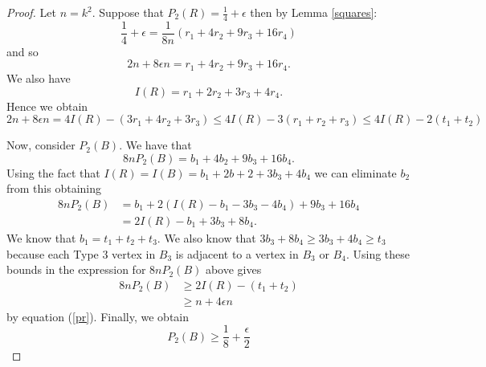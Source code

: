 \documentclass[10pt,a4paper]{amsart}
\newcommand{\eps}{\epsilon}
\begin{document}
\begin{proof}
Let $n=k^2$. Suppose that $P_2(R)=\frac{1}{4}+\eps$ then by Lemma \ref{squares}:
\[
\frac{1}{4}+\eps=\frac{1}{8n}\left(r_1+4r_2+9r_3+16r_4\right)
\]
and so
\[
2n+8\eps n=r_1+4r_2+9r_3+16r_4.
\]
We also have 
\[
I(R)=r_1+2r_2+3r_3+4r_4.
\]
Hence we obtain
\begin{equation}\label{pr}
2n+8\eps n=4I(R)-(3r_1+4r_2+3r_3)\leq 4I(R)-3(r_1+r_2+r_3)\leq 4I(R)-2(t_1+t_2)
\end{equation}

Now, consider $P_2(B)$. We have that
\[
8nP_2(B)=b_1+4b_2+9b_3+16b_4.
\]
Using the fact that $I(R)=I(B)=b_1+2b+2+3b_3+4b_4$ we can eliminate $b_2$ from this obtaining 
\begin{align*}
8nP_2(B)&=b_1+2\left(I(R)-b_1-3b_3-4b_4\right)+9b_3+16b_4\\
&=2I(R)-b_1+3b_3+8b_4.
\end{align*}
We know that $b_1=t_1+t_2+t_3$. We also know that $3b_3+8b_4\geq 3b_3+4b_4\geq t_3$ because each Type $3$ vertex in $B_3$ is adjacent to a vertex in $B_3$ or $B_4$. Using these bounds in the expression for $8nP_2(B)$ above gives
\begin{align*}
8nP_2(B)&\geq 2I(R)-(t_1+t_2)\\
&\geq n +4\eps n
\end{align*}
by equation (\ref{pr}). Finally, we obtain
\[
P_2(B)\geq\frac{1}{8}+\frac{\eps}{2}
\]
\end{proof}
\end{document}
